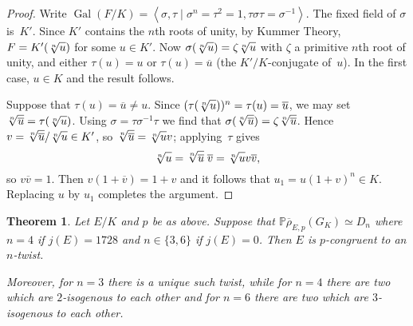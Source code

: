 \documentclass[twoside,leqno,symbols-for-thanks, draft]{rmi}
\numberwithin{equation}{section}
\newcommand{\PP}{\mathbb{P}}
\newcommand{\rhobar}{{\overline{\rho}}}
\DeclareMathOperator{\Gal}{Gal}
\newtheorem{theorem}{Theorem}[section]
\theoremstyle{remark}
\begin{document}
\begin{proof}\label{L:Dn}
Write $\Gal(F/K)=\left<\sigma,\tau\mid\sigma^n=\tau^2=1,
\tau\sigma\tau=\sigma^{-1}\right>$.  The fixed field of $\sigma$
is~$K'$.  Since $K'$ contains the $n$th roots of unity, by Kummer
Theory, $F=K'(\rnu)$ for some $u\in K'$.  Now $\sigma(\rnu)=\zeta\rnu$
with $\zeta$ a primitive $n$th root of unity, and either $\tau(u)=u$
or $\tau(u)=\overline{u}$ (the $K'/K$-conjugate of~$u$).  In the first
case, $u\in K$ and the result follows.

Suppose that $\tau(u)=\overline{u}\not=u$.  Since
$(\tau(\rnu))^n=\tau(u)=\overline{u}$, we may set $\rnub=\tau(\rnu)$.
Using $\sigma=\tau\sigma^{-1}\tau$ we find that
$\sigma(\rnub)=\zeta\rnub$.  Hence $v=\rnub/\rnu\in K'$, so
$\rnub=\rnu v$;  applying~$\tau$ gives
\[
\rnu = \rnub\;\overline{v} = \rnu v\overline{v},
\]
so $v\overline{v}=1$.  Then $v(1+\overline{v})=1+v$ and it follows
that $u_1=u(1+v)^n\in K$.  Replacing $u$ by $u_1$ completes the
argument.
\end{proof}


\begin{theorem} \label{T:higherTwists}
Let $E/K$ and $p$ be as above. Suppose that $\PP \rhobar_{E,p}(G_K) \simeq D_n$ where $n=4$ if
$j(E)=1728$ and $n\in\{3,6\}$ if $j(E)=0$.
Then $E$ is $p$-congruent to an $n$-twist.  

Moreover, for $n=3$ there is a
unique such twist, while for $n=4$ there are two which are
$2$-isogenous to each other and for $n=6$ there are two which are
$3$-isogenous to each other.
\end{theorem}
\end{document}
